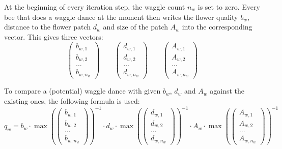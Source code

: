 			At the beginning of every iteration step, the waggle count $n_w$ is set to zero. Every bee that does a waggle dance at the moment then writes the flower quality $b_w$, distance to the flower patch $d_w$ and size of the patch $A_w$ into the corresponding vector. This gives three vectors:			
			\[
				\begin{pmatrix}
					b_{w,1} \\ b_{w,2} \\ \dots \\ b_{w,n_w}
				\end{pmatrix}
				\qquad
				\begin{pmatrix}
					d_{w,1} \\ d_{w,2} \\ \dots \\ d_{w,n_w}
				\end{pmatrix}
				\qquad
				\begin{pmatrix}
					A_{w,1} \\ A_{w,2} \\ \dots \\ A_{w,n_w}
				\end{pmatrix}
			\]
			
			To compare a (potential) waggle dance with given $b_w$, $d_w$ and $A_w$ against the existing ones, the following formula is used:
			\begin{equation}\label{eq:evalPatchQuality}
				q_w = b_w \cdot
				\max(
				\begin{pmatrix}
					b_{w,1} \\ b_{w,2} \\ \dots \\ b_{w,n_w}
				\end{pmatrix})^{-1}
				\cdot
				d_w \cdot
				\max(
				\begin{pmatrix}
					d_{w,1} \\ d_{w,2} \\ \dots \\ d_{w,n_w}
				\end{pmatrix})^{-1}
				\cdot
				A_w \cdot
				\max(
				\begin{pmatrix}
					A_{w,1} \\ A_{w,2} \\ \dots \\ A_{w,n_w}
				\end{pmatrix})^{-1}
			\end{equation}
			
